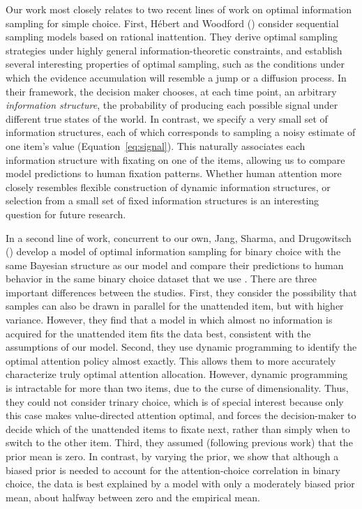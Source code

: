 Our work most closely relates to two recent lines of work on optimal information sampling for simple choice. First, H\'ebert and Woodford (\citeyear{hebert2017rational,hebert2019rational}) consider sequential sampling models based on rational inattention. They derive optimal sampling strategies under highly general information-theoretic constraints, and establish several interesting properties of optimal sampling, such as the conditions under which the evidence accumulation will resemble a jump or a diffusion process. In their framework, the decision maker chooses, at each time point, an arbitrary \emph{information structure}, the probability of producing each possible signal under different true states of the world. In contrast, we specify a very small set of information structures, each of which corresponds to sampling a noisy estimate of one item's value (Equation~\ref{eq:signal}). This naturally associates each information structure with fixating on one of the items, allowing us to compare model predictions to human fixation patterns. Whether human attention more closely resembles flexible construction of dynamic information structures, or selection from a small set of fixed information structures is an interesting question for future research.

In a second line of work, concurrent to our own, Jang, Sharma, and Drugowitsch (\citeyear{jang2021optimal}) develop a model of optimal information sampling for binary choice with the same Bayesian structure as our model and compare their predictions to human behavior in the same binary choice dataset that we use \citep{krajbich2010visual}. There are three important differences between the studies. First, they consider the possibility that samples can also be drawn in parallel for the unattended item, but with higher variance. However, they find that a model in which almost no information is acquired for the unattended item fits the data best, consistent with the assumptions of our model. Second, they use dynamic programming to identify the optimal attention policy almost exactly. This allows them to more accurately characterize truly optimal attention allocation. However, dynamic programming is intractable for more than two items, due to the curse of dimensionality. Thus, they could not consider trinary choice, which is of special interest because only this case makes value-directed attention optimal, and forces the decision-maker to decide which of the unattended items to fixate next, rather than simply when to switch to the other item. Third, they assumed (following previous work) that the prior mean is zero. In contrast, by varying the prior, we show that although a biased prior is needed to account for the attention-choice correlation in binary choice, the data is best explained by a model with only a moderately biased prior mean, about halfway between zero and the empirical mean.

